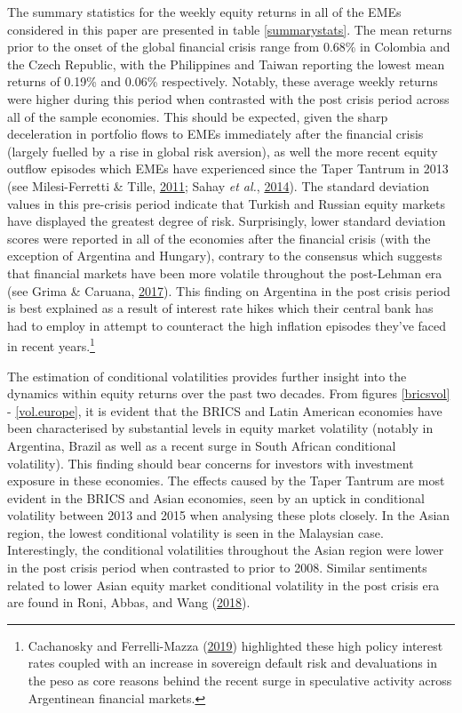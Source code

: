 \documentclass[11pt,preprint, authoryear]{elsarticle}
\numberwithin{equation}{section}
\numberwithin{figure}{section}
\numberwithin{table}{section}
\let\rmarkdownfootnote\footnote%
\def\footnote{\protect\rmarkdownfootnote}
\begin{document}
The summary statistics for the weekly equity returns in all of the EMEs
considered in this paper are presented in table \ref{summarystats}. The
mean returns prior to the onset of the global financial crisis range
from 0.68\% in Colombia and the Czech Republic, with the Philippines and
Taiwan reporting the lowest mean returns of 0.19\% and 0.06\%
respectively. Notably, these average weekly returns were higher during
this period when contrasted with the post crisis period across all of
the sample economies. This should be expected, given the sharp
deceleration in portfolio flows to EMEs immediately after the financial
crisis (largely fuelled by a rise in global risk aversion), as well the
more recent equity outflow episodes which EMEs have experienced since
the Taper Tantrum in 2013 (see Milesi-Ferretti \& Tille,
\protect\hyperlink{ref-milesi2011great}{2011}; Sahay \emph{et al.},
\protect\hyperlink{ref-sahay2014emerging}{2014}). The standard
deviation values in this pre-crisis period indicate that Turkish and
Russian equity markets have displayed the greatest degree of risk.
Surprisingly, lower standard deviation scores were reported in all of
the economies after the financial crisis (with the exception of
Argentina and Hungary), contrary to the consensus which suggests that
financial markets have been more volatile throughout the post-Lehman era
(see Grima \& Caruana, \protect\hyperlink{ref-grima2017effect}{2017}).
This finding on Argentina in the post crisis period is best explained as
a result of interest rate hikes which their central bank has had to
employ in attempt to counteract the high inflation episodes they've
faced in recent years.\footnote{Cachanosky and Ferrelli-Mazza
  (\protect\hyperlink{ref-cachanosky2019did}{2019}) highlighted these
  high policy interest rates coupled with an increase in sovereign
  default risk and devaluations in the peso as core reasons behind the
  recent surge in speculative activity across Argentinean financial
  markets.}

The estimation of conditional volatilities provides further insight into
the dynamics within equity returns over the past two decades. From
figures \ref{bricsvol} - \ref{vol.europe}, it is evident that the BRICS
and Latin American economies have been characterised by substantial
levels in equity market volatility (notably in Argentina, Brazil as well
as a recent surge in South African conditional volatility). This finding
should bear concerns for investors with investment exposure in these
economies. The effects caused by the Taper Tantrum are most evident in
the BRICS and Asian economies, seen by an uptick in conditional
volatility between 2013 and 2015 when analysing these plots closely. In
the Asian region, the lowest conditional volatility is seen in the
Malaysian case. Interestingly, the conditional volatilities throughout
the Asian region were lower in the post crisis period when contrasted to
prior to 2008. Similar sentiments related to lower Asian equity market
conditional volatility in the post crisis era are found in Roni, Abbas,
and Wang (\protect\hyperlink{ref-roni2018return}{2018}).
\end{document}
